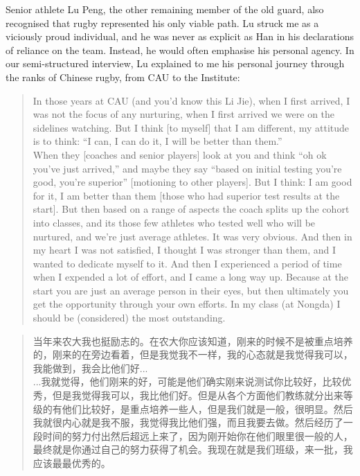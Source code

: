 \begin{CJK}{UTF8}{gbsn}
Senior athlete Lu Peng, the other remaining member of the old guard, also recognised that rugby represented his only viable path. Lu struck me as a viciously proud individual, and he was never as explicit as Han in his declarations of reliance on the team.  Instead, he would often emphasise his personal agency.  In our semi-structured interview, Lu explained to me his personal journey through the ranks of Chinese rugby, from CAU to the Institute:

\begin{quote}
    In those years at CAU (and you’d know this Li Jie), when I first arrived, I was not the focus of any nurturing, when I first arrived we were on the sidelines watching.  But I think [to myself] that I am different, my attitude is to think: ``I can, I can do it, I will be better than them.''\\

    When they [coaches and senior players] look at you and think ``oh ok you’ve just arrived,'' and maybe they say ``based on initial testing you’re good, you’re superior'' [motioning to other players]. But I think: I am good for it, I am better than them [those who had superior test results at the start].  But then based on a range of aspects the coach splits up the cohort into classes, and its those few athletes who tested well who will be nurtured, and we’re just average athletes.  It was very obvious. And then in my heart I was not satisfied, I thought I was stronger than them, and I wanted to dedicate myself to it.  And then I experienced a period of time when I expended a lot of effort, and I came a long way up.  Because at the start you are just an average person in their eyes, but then ultimately you get the opportunity through your own efforts. In my class (at Nongda) I should be (considered) the most outstanding.
\end{quote}

    \begin{quote}
    当年来农大我也挺励志的。在农大你应该知道，刚来的时候不是被重点培养的，刚来的在旁边看着，但是我觉我不一样，我的心态就是我觉得我可以，我能做到，我会比他们好...\\

    ...我就觉得，他们刚来的好，可能是他们确实刚来说测试你比较好，比较优秀，但是我觉得我可以，我比他们好。但是从各个方面他们教练就分出来等级的有他们比较好，是重点培养一些人，但是我们就是一般，很明显。然后我就很内心就是我不服，我觉得我比他们强，而且我要去做。然后经历了一段时间的努力付出然后超远上来了，因为刚开始你在他们眼里很一般的人，最终就是你通过自己的努力获得了机会。我现在就是我们班级，来一批，我应该最最优秀的。
    \end{quote}


\end{CJK}
